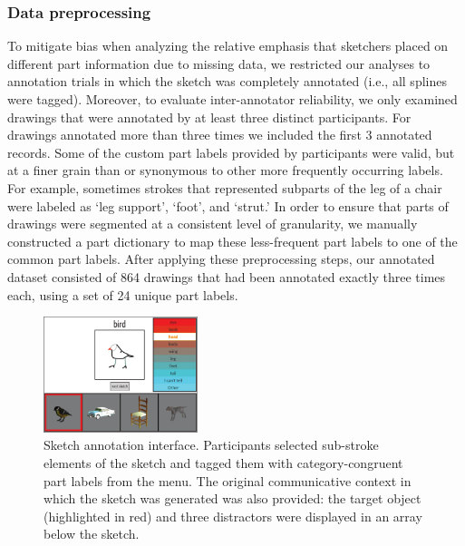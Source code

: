 \documentclass[10pt,letterpaper]{article}
\begin{document}
\subsubsection{Data preprocessing}

To mitigate bias when analyzing the relative emphasis that sketchers placed on different part information due to missing data, we restricted our analyses to annotation trials in which the sketch was completely annotated (i.e., all splines were tagged). 
Moreover, to evaluate inter-annotator reliability, we only examined drawings that were annotated by at least three distinct participants. For drawings annotated more than three times we included the first 3 annotated records.
Some of the custom part labels provided by participants were valid, but at a finer grain than or synonymous to other more frequently occurring labels. 
For example, sometimes strokes that represented subparts of the leg of a chair were labeled as `leg support', `foot', and `strut.'
In order to ensure that parts of drawings were segmented at a consistent level of granularity, we manually constructed a part dictionary to map these less-frequent part labels to one of the common part labels. 
After applying these preprocessing steps, our annotated dataset consisted of 864 drawings that had been annotated exactly three times each, using a set of 24 unique part labels. 


\begin{figure}[htbp]
\centering
\includegraphics[width=0.4\textwidth]{figures/4_annotation_interface.pdf}
\caption{Sketch annotation interface. Participants selected sub-stroke elements of the sketch and tagged them with category-congruent part labels from the menu. The original communicative context in which the sketch was generated was also provided: the target object (highlighted in red) and three distractors were displayed in an array below the sketch.}
\label{annotation_interface}
\end{figure}
\end{document}
